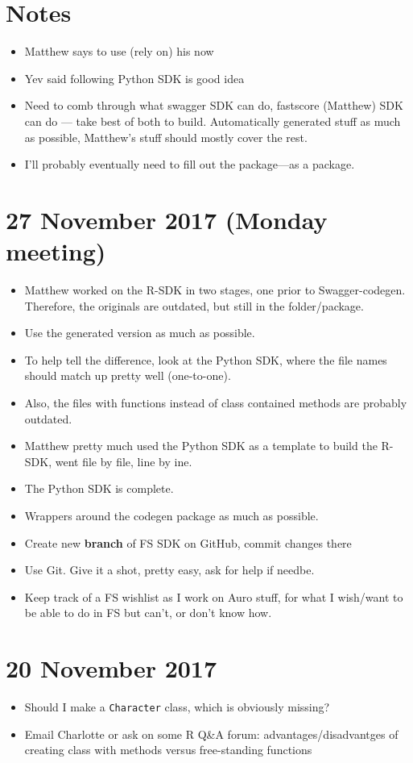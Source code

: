 \documentclass{article}
\begin{document}
\section*{Notes}
\begin{itemize}
\item Matthew says to use (rely on) his now
\item Yev said following Python SDK is good idea
\item Need to comb through what swagger SDK can do, fastscore (Matthew) SDK can do --- take best of both to build. Automatically generated stuff as much as possible, Matthew's stuff should mostly cover the rest.
\item I'll probably eventually need to fill out the package---as a package.
\end{itemize}

\section*{27 November 2017 (Monday meeting)}
\begin{itemize}
\item Matthew worked on the R-SDK in two stages, one prior to Swagger-codegen. Therefore, the originals are outdated, but still in the folder/package.
\item Use the generated version as much as possible.
\item To help tell the difference, look at the Python SDK, where the file names should match up pretty well (one-to-one).
\item Also, the files with functions instead of class contained methods are probably outdated.
\item Matthew pretty much used the Python SDK as a template to build the R-SDK, went file by file, line by ine.
\item The Python SDK is complete.
\item Wrappers around the codegen package as much as possible.
\item Create new {\bf branch} of FS SDK on GitHub, commit changes there
\item Use Git. Give it a shot, pretty easy, ask for help if needbe.
\item Keep track of a FS wishlist as I work on Auro stuff, for what I wish/want to be able to do in FS but can't, or don't know how.
\end{itemize}

\section*{20 November 2017}
\begin{itemize}
\item Should I make a \verb|Character| class, which is obviously missing?
\item Email Charlotte or ask on some R Q\&A forum: advantages/disadvantges of creating class with methods versus free-standing functions
\end{itemize}
\end{document}
